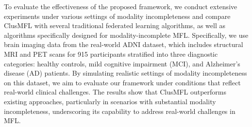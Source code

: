 To evaluate the effectiveness of the proposed framework, we conduct extensive experiments under various settings of modality incompleteness and compare ClusMFL with several traditional federated learning algorithms, as well as algorithms specifically designed for modality-incomplete MFL. 
Specifically, we use brain imaging data from the real-world ADNI dataset, which includes structural MRI and PET scans for 915 participants stratified into three diagnostic categories: healthy controls, mild cognitive impairment (MCI), and Alzheimer’s disease (AD) patients. By simulating realistic settings of modality incompleteness on this dataset, we aim to evaluate our framework under conditions that reflect real-world clinical challenges. 
The results show that ClusMFL outperforms existing approaches, particularly in scenarios with substantial modality incompleteness, underscoring its capability to address real-world challenges in MFL.




